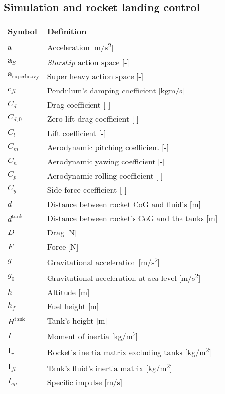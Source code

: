 \subsection*{Simulation and rocket landing control}


\begin{longtable}{p{2.5cm}p{12cm}}
    \toprule
    Symbol & Definition \\
    \midrule\endhead
    a & Acceleration [m/s\textsuperscript{2}] \\
    $\mathbf{a}_{S}$ & \textit{Starship} action space [-] \\
    $\mathbf{a}_{\text{superheavy}}$ & Super heavy action space [-] \\
    $c_{fl}$ & Pendulum's damping coefficient [kgm/s] \\
    $C_d$ & Drag coefficient [-] \\
    $C_{d,0}$ & Zero-lift drag coefficient [-] \\
    $C_l$ & Lift coefficient [-] \\
    $C_m$ & Aerodynamic pitching coefficient [-] \\
    $C_n$ & Aerodynamic yawing coefficient [-] \\
    $C_p$ & Aerodynamic rolling coefficient [-] \\
    $C_y$ & Side-force coefficient [-] \\
    $d$ & Distance between rocket CoG and fluid's [m] \\
    $d^{\text{tank}}$ & Distance between rocket's CoG and the tanks [m] \\
    $D$ & Drag [N] \\
    $F$ & Force [N] \\
    $g$ & Gravitational acceleration [m/s\textsuperscript{2}] \\
    $g_0$ & Gravitational acceleration at sea level [m/s\textsuperscript{2}] \\
    $h$ & Altitude [m] \\
    $h_f$ & Fuel height [m] \\
    $H^{\text{tank}}$ & Tank's height [m] \\
    $I$ & Moment of inertia [kg/m\textsuperscript{2}] \\
    $\mathbf{I}_r$ & Rocket's inertia matrix excluding tanks [kg/m\textsuperscript{2}] \\
    $\mathbf{I}_{fl}$ & Tank's fluid's inertia matrix [kg/m\textsuperscript{2}] \\
    $I_{sp}$ & Specific impulse [m/s] \\

\end{longtable}
